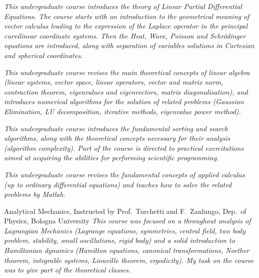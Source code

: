 \documentclass[helvetica,narrow,openbib,notitle,noflag, nologo]{europecv}
\begin{document}
\begin{europecv}

\ecvitem{} {\it This undergraduate course introduces the theory of Linear Partial Differential Equations. The course starts with an introduction to the geometrical 
meaning of vector calculus leading to the expression of the Laplace operator in the principal curvilinear coordinate systems. Then the Heat, Wave, Poisson and Schr\"odinger equations are introduced, along with separation of variables 
solutions in Cartesian and spherical coordinates.}

\ecvitem{} {\it This undergraduate course revises the main theoretical concepts of linear algebra (linear systems, vector space, linear operators, vector and matrix norm,
contraction theorem, eigenvalues and eigenvectors, matrix diagonalisation), and introduces numerical algorithms for the solution of related problems (Gaussian Elimination,
LU decomposition, iterative methods, eigenvalue power method).\\}

\ecvitem{} {\it This undergraduate course introduces the fundamental sorting and search algorithms, along with the theoretical concepts necessary for
their analysis (algorithm complexity). Part of the course is directed to practical exercitations aimed at acquiring the abilities for performing scientific programming.\\}

\ecvitem{} {\it This undergraduate course revises the fundamental concepts of applied calculus (up to ordinary differential equations) and 
teaches how to solve the related problems by  Matlab.\\}

 {Analytical Mechanics, Instructed by Prof.~Turchetti and F.~Zanlungo, Dep.~of Physics, Bologna University}
\ecvitem{} {\it This course was focused on a throughout analysis of Lagrangian Mechanics (Lagrange equations, symmetries,
central field, two body problem, stability, small oscillations, rigid body) and a solid introduction to Hamiltonian dynamics (Hamilton equations, canonical  transformations, Noether theorem,
integrable systems, Liouville theorem, ergodicity). My task on the course was to give part of the theoretical classes.\\}


\end{europecv}
\end{document}
